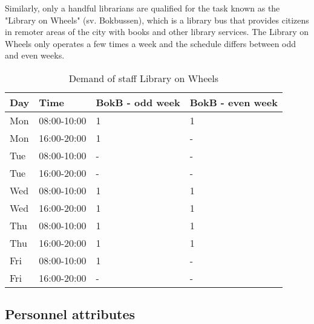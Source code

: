 Similarly, only a handful librarians are qualified for the task known as the "Library on Wheels" (sv. Bokbussen), which is a library bus that provides citizens in remoter areas of the city with books and other library services. The Library on Wheels only operates a few times a week and the schedule differs between odd and even weeks.

\begin{table}[!h]
\centering
\caption{Demand of staff Library on Wheels}
\label{tab:LOW_Demand}
\begin{tabularx}{0.85\textwidth}{|l|l|l|X|}
\hline
\textbf{Day} & \textbf{Time} & \textbf{BokB - odd week} & \textbf{BokB - even week} 
\\ \hline 
\rowcolor{Gray} 
Mon & 08:00-10:00 & 1 & 1
\\ \hline 
\rowcolor{Gray}  
Mon & 16:00-20:00 & 1 & -
\\ \hline 
Tue & 08:00-10:00 & - & -
\\ \hline 
Tue & 16:00-20:00 & - & -
\\ \hline 
\rowcolor{Gray} 
Wed & 08:00-10:00 & 1 & 1
\\ \hline 
\rowcolor{Gray} 
Wed & 16:00-20:00 & 1 & 1
\\ \hline 
Thu & 08:00-10:00 & 1 & 1
\\ \hline 
Thu & 16:00-20:00 & 1 & 1
\\ \hline 
\rowcolor{Gray}
Fri & 08:00-10:00 & 1 & -
\\ \hline 
\rowcolor{Gray}
Fri & 16:00-20:00 & - & -
\\ \hline 
\end{tabularx}
\end{table} 

\subsection{Personnel attributes}

